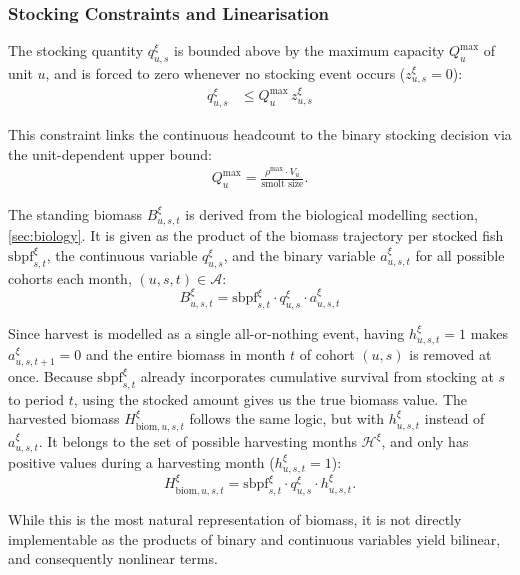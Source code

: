 \documentclass[12pt,a4paper]{article}
\begin{document}
 
\subsubsection{Stocking Constraints and Linearisation}
 
The stocking quantity $q^\xi_{u,s}$ is bounded above by the maximum capacity $Q^{\max}_{u}$ of unit $u$, and is forced to zero whenever no stocking event occurs ($z^\xi_{u,s} = 0$):
\begin{align}
  q^\xi_{u,s} &\leq Q^{\max}_{u}\, z^\xi_{u,s}
\end{align}
 
This constraint links the continuous headcount to the binary stocking decision via the unit-dependent upper bound:
\begin{align}
Q^{\max}_{u} = \frac{\rho^{\max} \cdot V_u}{\text{smolt size}}.
\end{align}
 
The standing biomass $B^\xi_{u,s,t}$ is derived from the biological modelling section, \ref{sec:biology}. It is given as the product of the biomass trajectory per stocked fish $\mathrm{sbpf}^\xi_{s,t}$, the continuous variable $q^\xi_{u,s}$, and the binary variable $a^\xi_{u,s,t}$ for all possible cohorts each month, $(u,s,t) \in \mathcal{A}$:
\begin{equation}
  B^\xi_{u,s,t} =
  \mathrm{sbpf}^\xi_{s,t} \cdot q^\xi_{u,s}\cdot a^\xi_{u,s,t}
  \label{eq:biom} 
\end{equation}
 
Since harvest is modelled as a single all-or-nothing event, having $h^\xi_{u,s,t} = 1$ makes $a^\xi_{u,s,t+1} = 0$ and the entire biomass in month $t$ of cohort $(u,s)$ is removed at once. Because $\mathrm{sbpf}^\xi_{s,t}$ already incorporates cumulative survival from stocking at $s$ to period $t$, using the stocked amount gives us the true biomass value. The harvested biomass $H^\xi_{\mathrm{biom},u,s,t}$ follows the same logic, but with $h^\xi_{u,s,t}$ instead of $a^\xi_{u,s,t}$. It belongs to the set of possible harvesting months $\mathcal{H}^\xi$, and only has positive values during a harvesting month ($h^\xi_{u,s,t} = 1$):
\begin{equation}
    H^\xi_{\mathrm{biom},u,s,t} = \mathrm{sbpf}^\xi_{s,t} \cdot q^\xi_{u,s} \cdot h^\xi_{u,s,t}.
\end{equation}
 
While this is the most natural representation of biomass, it is not directly implementable as the products of binary and continuous variables yield bilinear, and consequently nonlinear terms.
 
\end{document}

